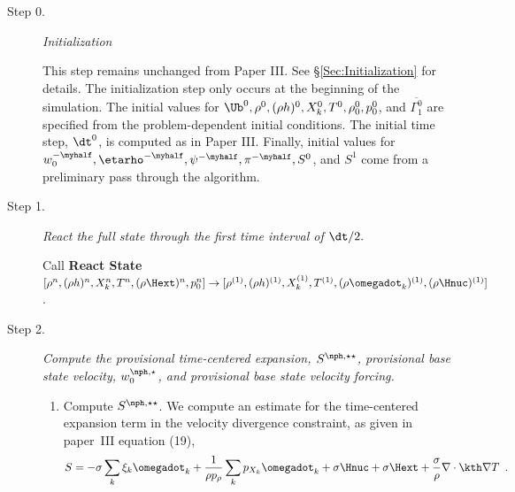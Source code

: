 \begin{description}


\item[Step 0.] {\em Initialization}

This step remains unchanged from Paper III.  See \S \ref{Sec:Initialization}
for details.  The initialization step only occurs at the beginning of the simulation.  
The initial values for $\Ub^0, \rho^0, (\rho h)^0, X_k^0, T^0, 
\rho_0^0, p_0^0$, and $\overline{\Gamma_1^0}$ are specified from the problem-dependent 
initial conditions.  The initial time step, $\dt^0$, is computed as in 
Paper III.  Finally, initial
values for $w_0^{-\myhalf}, \etarho^{-\myhalf}, \psi^{-\myhalf}, 
\pi^{-\myhalf}, S^0$, and $S^1$ come from a preliminary pass through
the algorithm.  

\item[Step 1.] {\em React the full state through the first time interval of $\dt / 2.$}

Call {\bf React State}$[\rho^n, (\rho h)^n, X_k^n, T^n, (\rho\Hext)^n, p_0^n]
 \rightarrow [\rho^{(1)},(\rho h)^{(1)},X_k^{(1)},T^{(1)},(\rho \omegadot_k)^{(1)},(\rho \Hnuc)^{(1)}]$.


\item[Step 2.] {\em Compute the provisional time-centered expansion,
  $S^{\nph,\star\star}$, provisional base state velocity,
  $w_0^{\nph,\star}$, and provisional base state velocity forcing.}

\begin{enumerate}
\renewcommand{\theenumi}{{\bf \Alph{enumi}}}

\item Compute $S^{\nph,\star\star}$.  We compute an estimate for the
  time-centered expansion term in the velocity divergence constraint,
  as given in paper~III equation (19),
\begin{equation}
  S =  -\sigma  \sum_k  \xi_k \omegadot_k  + 
  \frac{1}{\rho p_\rho} \sum_k p_{X_k}  {\omegadot}_k  + \sigma \Hnuc + \sigma \Hext 
  + \frac{\sigma}{\rho}\nabla\cdot\kth\nabla T \enskip .
\label{eq:defineS} 
\end{equation}


\end{enumerate}
\end{description}
